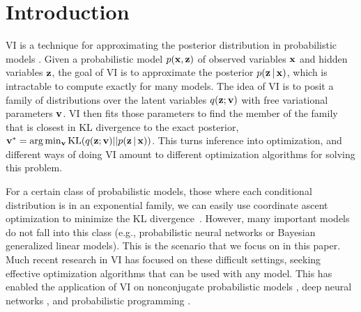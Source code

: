 \vspace*{-10pt}
\section{Introduction}
\vspace*{-5pt}


\Gls{VI} is a technique for approximating
the posterior distribution in probabilistic models
\citep{Jordan1999,Wainwright2008}.
Given a probabilistic model $p(\mathbf{x}, \mathbf{z})$ of observed variables $\mathbf{x}$ and hidden variables $\mathbf{z}$, the goal of \gls{VI} is to approximate the posterior
$p(\mathbf{z} \, | \, \mathbf{x})$, which is intractable to compute exactly for
many models. The idea of \gls{VI} is to posit
a family of distributions over the latent variables $q(\mathbf{z} ; \mathbf{v})$
with free variational parameters $\mathbf{v}$. \gls{VI} then fits those parameters
to find the member of the family that is closest in \gls{KL} divergence to the
exact posterior,
$\mathbf{v}^* = \arg \min_{\mathbf{v}} \textrm{KL}(q(\mathbf{z} ; \mathbf{v}) || p(\mathbf{z} \, | \, \mathbf{x}))$.
This turns inference into optimization, and different ways of doing
\gls{VI} amount to different optimization algorithms for
solving this problem.

For a certain class of probabilistic models, those where each
conditional distribution is in an exponential family, we can easily
use coordinate ascent optimization to minimize the \gls{KL}
divergence~\citep{Ghahramani2001}. However, many important models do
not fall into this class (e.g., probabilistic neural networks or
Bayesian generalized linear models).
This is the scenario that we focus on in this paper.
Much recent research in \gls{VI} has focused on
these difficult settings, seeking effective optimization algorithms
that can be used with any model. This has enabled the application of
\gls{VI} on nonconjugate probabilistic models
\citep{Carbonetto2009,Paisley2012,Ranganath2014,Titsias2014_doubly},
deep neural networks
\citep{Neal1992,Hinton1995,Mnih2014,Kingma2014}, and probabilistic
programming \citep{Wingate2013,Kucukelbir2015,vandeMeent2016}.


